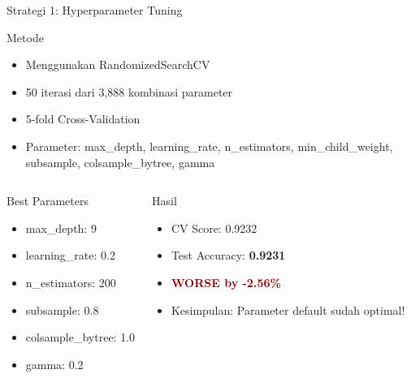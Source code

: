 \documentclass[aspectratio=169]{beamer}
\begin{document}
\begin{frame}{Strategi 1: Hyperparameter Tuning}
\begin{block}{Metode}
\begin{itemize}
    \item Menggunakan RandomizedSearchCV
    \item 50 iterasi dari 3,888 kombinasi parameter
    \item 5-fold Cross-Validation
    \item Parameter: max\_depth, learning\_rate, n\_estimators, min\_child\_weight, subsample, colsample\_bytree, gamma
\end{itemize}
\end{block}

\begin{columns}
\begin{block}{Best Parameters}
\tiny
\begin{itemize}
    \item max\_depth: 9
    \item learning\_rate: 0.2
    \item n\_estimators: 200
    \item subsample: 0.8
    \item colsample\_bytree: 1.0
    \item gamma: 0.2
\end{itemize}
\end{block}

\begin{alertblock}{Hasil}
\begin{itemize}
    \item CV Score: 0.9232
    \item Test Accuracy: \textbf{0.9231}
    \item \textcolor{darkred}{\textbf{WORSE by -2.56\%}}
    \item Kesimpulan: Parameter default sudah optimal!
\end{itemize}
\end{alertblock}
\end{columns}
\end{frame}
\end{document}
